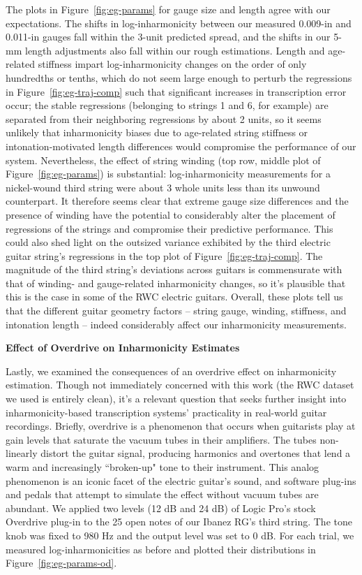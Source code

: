 \documentclass[12pt]{cmuthesis}
\begin{document}
The plots in Figure~\ref{fig:eg-params} for gauge size and length agree with our expectations. The shifts in log-inharmonicity between our measured 0.009-in and 0.011-in gauges fall within the 3-unit predicted spread, and the shifts in our 5-mm length adjustments also fall within our rough estimations. Length and age-related stiffness impart log-inharmonicity changes on the order of only hundredths or tenths, which do not seem large enough to perturb the regressions in Figure~\ref{fig:eg-traj-comp} such that significant increases in transcription error occur; the stable regressions (belonging to strings 1 and 6, for example) are separated from their neighboring regressions by about 2 units, so it seems unlikely that inharmonicity biases due to age-related string stiffness or intonation-motivated length differences would compromise the performance of our system. Nevertheless, the effect of string winding (top row, middle plot of Figure~\ref{fig:eg-params}) is substantial: log-inharmonicity measurements for a nickel-wound third string were about 3 whole units less than its unwound counterpart. It therefore seems clear that extreme gauge size differences and the presence of winding have the potential to considerably alter the placement of regressions of the strings and compromise their predictive performance. This could also shed light on the outsized variance exhibited by the third electric guitar string's regressions in the top plot of Figure~\ref{fig:eg-traj-comp}. The magnitude of the third string's deviations across guitars is commensurate with that of winding- and gauge-related inharmonicity changes, so it's plausible that this is the case in some of the RWC electric guitars. Overall, these plots tell us that the different guitar geometry factors -- string gauge, winding, stiffness, and intonation length -- indeed considerably affect our inharmonicity measurements.

\textbf{Effect of Overdrive on Inharmonicity Estimates}

Lastly, we examined the consequences of an overdrive effect on inharmonicity estimation. Though not immediately concerned with this work (the RWC dataset we used is entirely clean), it's a relevant question that seeks further insight into inharmonicity-based transcription systems' practicality in real-world guitar recordings. Briefly, overdrive is a phenomenon that occurs when guitarists play at gain levels that saturate the vacuum tubes in their amplifiers. The tubes non-linearly distort the guitar signal, producing harmonics and overtones that lend a warm and increasingly ``broken-up" tone to their instrument. This analog phenomenon is an iconic facet of the electric guitar's sound, and software plug-ins and pedals that attempt to simulate the effect without vacuum tubes are abundant. We applied two levels (12 dB and 24 dB) of Logic Pro's stock Overdrive plug-in to the 25 open notes of our Ibanez RG's third string. The tone knob was fixed to 980 Hz and the output level was set to 0 dB. For each trial, we measured log-inharmonicities as before and plotted their distributions in Figure~\ref{fig:eg-params-od}.
\end{document}
